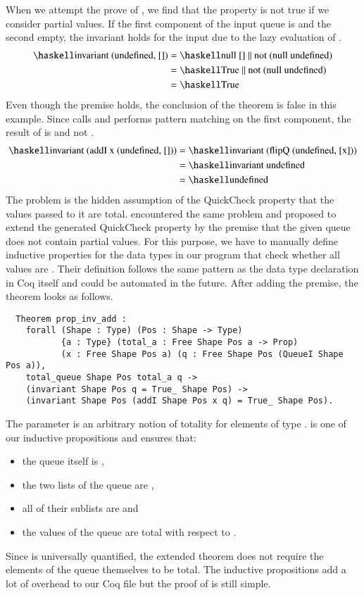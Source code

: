 When we attempt the prove of , we find that the property is not true if we consider partial values.
If the first component of the input queue is  and the second empty, the invariant holds for the input due to the lazy evaluation of \haskell{(||)}.
\begin{align*}
  \haskellM{invariant (undefined, [])}
  &= \haskellM{null [] || not (null undefined)} \\
  &= \haskellM{True || not (null undefined)} \\
  &= \haskellM{True}
\end{align*}
Even though the premise holds, the conclusion of the theorem is false in this example.
Since  calls  and  performs pattern matching on the first component, the result of  is  and not .
\begin{align*}
  \haskellM{invariant (addI x (undefined, []))}
  &= \haskellM{invariant (flipQ (undefined, [x]))} \\
  &= \haskellM{invariant undefined} \\
  &= \haskellM{undefined}
\end{align*}
The problem is the hidden assumption of the QuickCheck property that the values passed to it are total.
\citet[p.~20]{Dylus:2018} encountered the same problem and proposed to extend the generated QuickCheck property by the premise that the given queue does not contain partial values.
For this purpose, we have to manually define inductive properties for the data types in our program that check whether all values are .
Their definition follows the same pattern as the data type declaration in Coq itself and could be automated in the future.
After adding the premise, the theorem looks as follows.
\begin{verbatim}
  Theorem prop_inv_add :
    forall (Shape : Type) (Pos : Shape -> Type)
           {a : Type} (total_a : Free Shape Pos a -> Prop)
           (x : Free Shape Pos a) (q : Free Shape Pos (QueueI Shape Pos a)),
    total_queue Shape Pos total_a q ->
    (invariant Shape Pos q = True_ Shape Pos) ->
    (invariant Shape Pos (addI Shape Pos x q) = True_ Shape Pos).
\end{verbatim}
The parameter  is an arbitrary notion of totality for elements of type .
 is one of our inductive propositions and ensures that:
\begin{itemize}
  \item the queue itself is ,
  \item the two lists of the queue are ,
  \item all of their sublists are  and
  \item the values of the queue are total with respect to .
\end{itemize}
Since  is universally quantified, the extended theorem does not require the elements of the queue themselves to be total.
The inductive propositions add a lot of overhead to our Coq file but the proof of  is still simple.

